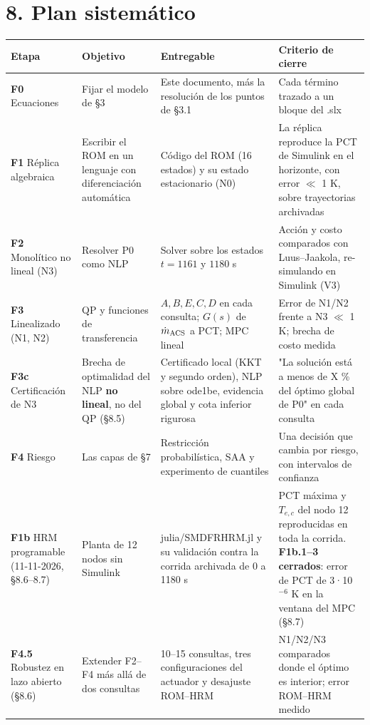 \documentclass[11pt,a4paper]{article}
\newcommand{\codeus}{\textunderscore\allowbreak}
\newcommand{\code}[1]{{\small\ttfamily\let\_\codeus #1}}
\begin{document}
\section*{8. Plan sistemático}
{\footnotesize
\begin{xltabular}{\linewidth}{@{}YYYY@{}}
\toprule
\textbf{Etapa} & \textbf{Objetivo} & \textbf{Entregable} & \textbf{Criterio de cierre} \\
\midrule
\endhead
\textbf{F0} Ecuaciones & Fijar el modelo de \S{}3 & Este documento, más la resolución de los puntos de \S{}3.1 & Cada término trazado a un bloque del \code{.slx} \\
\textbf{F1} Réplica algebraica & Escribir el ROM en un lenguaje con diferenciación automática & Código del ROM (16 estados) y su estado estacionario (N0) & La réplica reproduce la PCT de Simulink en el horizonte, con error $\ll$ 1 K, sobre trayectorias archivadas \\
\textbf{F2} Monolítico no lineal (N3) & Resolver P0 como NLP & Solver sobre los estados $t=1161$ y $1180$ s & Acción y costo comparados con Luus–Jaakola, re-simulando en Simulink (V3) \\
\textbf{F3} Linealizado (N1, N2) & QP y funciones de transferencia & $A,B,E,C,D$ en cada consulta; $G(s)$ de $\dot m_{\rm ACS}$ a PCT; MPC lineal & Error de N1/N2 frente a N3 $\ll$ 1 K; brecha de costo medida \\
\textbf{F3c} Certificación de N3 & Brecha de optimalidad del NLP \textbf{no lineal}, no del QP (\S{}8.5) & Certificado local (KKT y segundo orden), NLP sobre \code{ode1be}, evidencia global y cota inferior rigurosa & "La solución está a menos de X \% del óptimo global de P0" en cada consulta \\
\textbf{F4} Riesgo & Las capas de \S{}7 & Restricción probabilística, SAA y experimento de cuantiles & Una decisión que cambia por riesgo, con intervalos de confianza \\
\textbf{F1b} HRM programable (11-11-2026, \S{}8.6–8.7) & Planta de 12 nodos sin Simulink & \code{julia/SMDFRHRM.jl} y su validación contra la corrida archivada de 0 a 1180 s & PCT máxima y $T_{e,c}$ del nodo 12 reproducidas en toda la corrida. \textbf{F1b.1–3 cerrados}: error de PCT de 3·10$^{-6}$ K en la ventana del MPC (\S{}8.7) \\
\textbf{F4.5} Robustez en lazo abierto (\S{}8.6) & Extender F2–F4 más allá de dos consultas & 10–15 consultas, tres configuraciones del actuador y desajuste ROM–HRM & N1/N2/N3 comparados donde el óptimo es interior; error ROM–HRM medido \\

\end{xltabular}}
\end{document}
